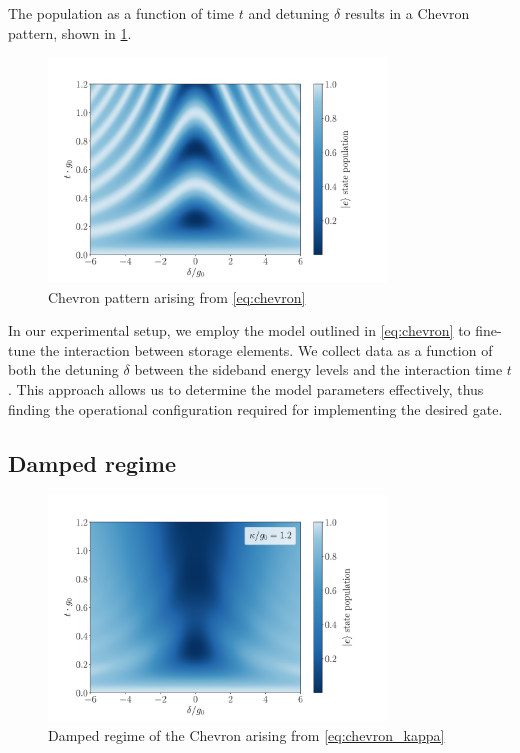 The population as a function of time $t$ and detuning $\delta$ results in a Chevron pattern, shown in \cref{fig:Chevron}.

\begin{figure}
    \centering
    \includegraphics[width = 0.8\textwidth]{Images/Chap3/Chevron.pdf}
    \caption{Chevron pattern arising from \cref{eq:chevron}}
    \label{fig:Chevron}
\end{figure}

In our experimental setup, we employ the model outlined in \cref{eq:chevron} to fine-tune the interaction between storage elements. 
We collect data as a function of both the detuning $\delta$ between the sideband energy levels and the interaction time $t$. 
This approach allows us to determine the model parameters effectively, thus finding the operational configuration required for implementing the desired gate.

\subsection{Damped regime}

\begin{figure}
    \centering
    \includegraphics[width = 0.8\textwidth]{Images/Chap3/Chevron_kappa.pdf}
    \caption{Damped regime of the Chevron arising from \cref{eq:chevron_kappa}}
    \label{fig:chevron_kappa}
\end{figure}

